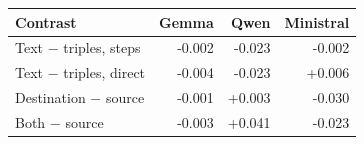 \begin{tabular}{lrrr}
\toprule
Contrast & Gemma & Qwen & Ministral \\
\midrule
Text $-$ triples, steps & -0.002 & -0.023 & -0.002 \\
Text $-$ triples, direct & -0.004 & -0.023 & +0.006 \\
Destination $-$ source & -0.001 & +0.003 & -0.030 \\
Both $-$ source & -0.003 & +0.041 & -0.023 \\
\bottomrule
\end{tabular}
